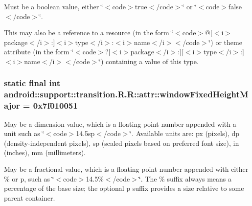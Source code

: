 Must be a boolean value, either \char`\"{}$<$code$>$true$<$/code$>$\char`\"{} or \char`\"{}$<$code$>$false$<$/code$>$\char`\"{}. 

This may also be a reference to a resource (in the form \char`\"{}$<$code$>$@\mbox{[}$<$i$>$package$<$/i$>$:\mbox{]}$<$i$>$type$<$/i$>$:$<$i$>$name$<$/i$>$$<$/code$>$\char`\"{}) or theme attribute (in the form \char`\"{}$<$code$>$?\mbox{[}$<$i$>$package$<$/i$>$:\mbox{]}\mbox{[}$<$i$>$type$<$/i$>$:\mbox{]}$<$i$>$name$<$/i$>$$<$/code$>$\char`\"{}) containing a value of this type. \hypertarget{classandroid_1_1support_1_1transition_1_1_r_1_1attr_7457f2347e843f4ad6415af8182daa05}{
\subsubsection[{windowFixedHeightMajor}]{\setlength{\rightskip}{0pt plus 5cm}static final int android::support::transition.R.R::attr::windowFixedHeightMajor = 0x7f010051}}
\label{classandroid_1_1support_1_1transition_1_1_r_1_1attr_7457f2347e843f4ad6415af8182daa05}


May be a dimension value, which is a floating point number appended with a unit such as \char`\"{}$<$code$>$14.5sp$<$/code$>$\char`\"{}. Available units are: px (pixels), dp (density-independent pixels), sp (scaled pixels based on preferred font size), in (inches), mm (millimeters). 

May be a fractional value, which is a floating point number appended with either \% or p, such as \char`\"{}$<$code$>$14.5\%$<$/code$>$\char`\"{}. The \% suffix always means a percentage of the base size; the optional p suffix provides a size relative to some parent container. 

